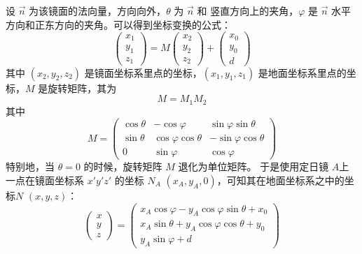 \documentclass[../main.tex]{subfiles}
\begin{document}
设 \(\vec n\) 为该镜面的法向量，方向向外，\(\theta\) 为 \(\vec n\) 和 竖直方向上的夹角，\(\varphi\) 是 \(\vec n\) 水平方向和正东方向的夹角。可以得到坐标变换的公式：
\begin{equation}
\begin{pmatrix}
x_{1}\\
y_1\\
z_1
\end{pmatrix}
= M
\begin{pmatrix}
x_2\\
y_2\\
z_2
\end{pmatrix} +
\begin{pmatrix}
x_0\\
y_0\\
d
\end{pmatrix}
\end{equation}
其中 \((x_2,y_2,z_2)\) 是镜面坐标系里点的坐标，\((x_1,y_1,z_1)\) 是地面坐标系里点的坐标，\(M\) 是旋转矩阵，其为
\[
M  = M_1 M_2
\]
其中
\begin{equation}\label{equ:transM}
M =
\begin{pmatrix}
\cos \theta & - \cos \varphi & \sin \varphi \sin \theta\\
\sin \theta & \cos \varphi \cos \theta & - \sin \varphi \cos \theta\\
0 & \sin \varphi & \cos \varphi
\end{pmatrix}
\end{equation}
特别地，当 \(\theta = 0\) 的时候，旋转矩阵 \(M\) 退化为单位矩阵。
于是使用定日镜 \(A\)上一点在镜面坐标系 \(x'y'z'\) 的坐标 \(N_{A}\) \((x_{A}, y_{A},0)\)，可知其在地面坐标系之中的坐标\(N\) \((x, y , z)\)：
\begin{equation}
\begin{pmatrix}
x\\
y\\
z
\end{pmatrix}
=
\begin{pmatrix}
x_{A} \cos \varphi - y_{A} \cos \varphi \sin \theta + x_0\\
x_{A} \sin \theta + y_{A} \cos \varphi \cos \theta + y_{0} \\
y_{A} \sin \varphi + d
\end{pmatrix}
\end{equation}
\end{document}
